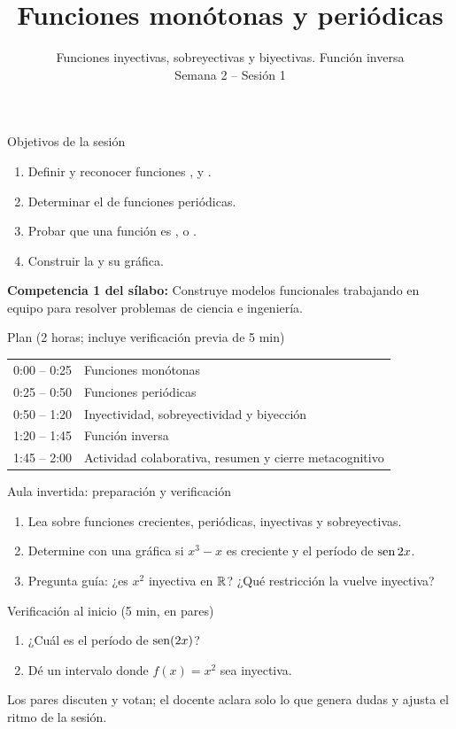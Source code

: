 \documentclass[10pt,aspectratio=169]{beamer}
\title[Monotonía, periodicidad, biyección]{Funciones monótonas y periódicas}
\subtitle{Funciones inyectivas, sobreyectivas y biyectivas. Función inversa\\[2pt]\small Semana 2 -- Sesión 1}
\begin{document}
\begin{frame}
  \titlepage
\end{frame}

\begin{frame}{Objetivos de la sesión}
  \begin{enumerate}
    \item Definir y reconocer funciones ,  y .
    \item Determinar el  de funciones periódicas.
    \item Probar que una función es ,  o .
    \item Construir la  y su gráfica.
  \end{enumerate}
  \vspace{1mm}
  {\small\textbf{Competencia 1 del sílabo:} Construye modelos funcionales trabajando en equipo para resolver problemas de ciencia e ingeniería.}
  \begin{block}{Plan (2 horas; incluye verificación previa de 5 min)}
    \begin{tabular}{ll}
      0:00 -- 0:25 & Funciones monótonas\\
      0:25 -- 0:50 & Funciones periódicas\\
      0:50 -- 1:20 & Inyectividad, sobreyectividad y biyección\\
      1:20 -- 1:45 & Función inversa\\
      1:45 -- 2:00 & Actividad colaborativa, resumen y cierre metacognitivo
    \end{tabular}
  \end{block}
\end{frame}

\begin{frame}{Aula invertida: preparación y verificación}
  \small
  \begin{previa}
    \begin{enumerate}
      \item Lea sobre funciones crecientes, periódicas, inyectivas y sobreyectivas.
      \item Determine con una gráfica si $x^3-x$ es creciente y el período de $\operatorname{sen} 2x$.
      \item Pregunta guía: ¿es $x^2$ inyectiva en $\mathbb{R}$? ¿Qué restricción la vuelve inyectiva?
    \end{enumerate}
  \end{previa}
  \begin{block}{Verificación al inicio (5 min, en pares)}
    \begin{enumerate}
      \item ¿Cuál es el período de $\operatorname{sen}(2x)$?
      \item Dé un intervalo donde $f(x)=x^2$ sea inyectiva.
    \end{enumerate}
    Los pares discuten y votan; el docente aclara solo lo que genera dudas y ajusta el ritmo de la sesión.
  \end{block}
\end{frame}
\end{document}
